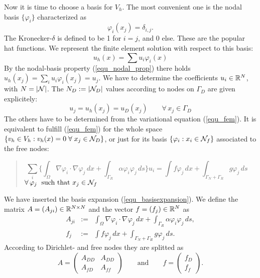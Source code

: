 Now it is time to choose a basis for $V_h$. The most convenient one is 
the nodal basis $\{ \varphi_i \}$ characterized as
%
\begin{equation}
\label{equ_nodal_prop}
\varphi_i(x_j) = \delta_{i,j}.
\end{equation}
%
The Kronecker-$\delta$ is defined to be 1 for $i=j$, and 0 else. These are the popular
hat functions.
We represent the finite element solution with respect to this basis:
\begin{equation}
\label{equ_basisexpansion}
u_h(x) = \sum u_i \varphi_i(x)
\end{equation}
By the nodal-basis property (\ref{equ_nodal_prop}) there holds 
$u_h(x_j) = \sum_i u_i \varphi_i(x_j) = u_j$.
We have to determine the coefficients $u_i \in {\mathbb R}^N$, with 
$N = | {\cal N} |$. The $N_D := | {\cal N}_D | $ values according to nodes on $\Gamma_D$ are
given explicitely:
$$
u_j = u_h (x_j) = u_D(x_j) \qquad \forall \, x_j \in \Gamma_D
$$
The others have to be determined from the variational equation (\ref{equ_fem}).
It is equivalent to fulfill (\ref{equ_fem}) for the whole space $\{ v_h \in V_h : v_h(x) = 0 \; \forall \; x_j \in {\cal N}_D \}$, or just for its basis 
$\{ \varphi_i : x_i \in {\cal N}_f\}$ associated to the free nodes:
\begin{quote}
\begin{equation}
\sum_i \Big\{ \int_\Omega \nabla \varphi_i \cdot \nabla \varphi_j \, dx +
 \int_{\Gamma_R} \alpha \varphi_i \varphi_j \, ds \Big\} u_i   = 
\int f \varphi_j \, dx + \int_{\Gamma_N+\Gamma_R} g \varphi_j \, ds \quad
\end{equation}
\hfill
$\forall \, \varphi_j \; \mbox{ such that } x_j \in {\cal N}_f$
\end{quote}
We have inserted the basis expansion (\ref{equ_basisexpansion}).
We define the matrix $A = (A_{ji}) \in {\mathbb R}^{N\times N}$ and the vector $f = (f_j) \in {\mathbb R}^N$ as
\begin{eqnarray*}
A_{ji} & := & \int_\Omega \nabla \varphi_i \cdot \nabla \varphi_j \, dx +
 \int_{\Gamma_R} \alpha \varphi_i \varphi_j \, ds, \\ 
f_j & := & \int f \varphi_j \, dx + \int_{\Gamma_N+\Gamma_R} g \varphi_j \, ds.
\end{eqnarray*}
According to Dirichlet- and free nodes they are splitted as
$$
A = \left( \begin{array}{cc}
        A_{DD} & A_{DD} \\
        A_{fD} & A_{ff} 
        \end{array} \right)
\qquad \text{and} \qquad
f = \left( \begin{array}{c}
        f_{D} \\
        f_{f}
        \end{array} \right).
$$
